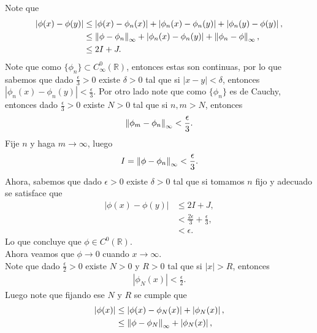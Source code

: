 \begin{homeworkProblem}
\begin{solution}
\begin{enumerate}[(i)]
        Note que
        \begin{align*}
          \left|\phi(x)-\phi(y)\right|&\leq\left| \phi(x)-\phi_{n}(x) \right|+\left| \phi_{n}(x)-\phi_{n}(y) \right|+\left| \phi_{n}(y)-\phi(y) \right|,\\
          &\leq\left\|\phi-\phi_{n}\right\|_{\infty}+\left|\phi_{n}(x)-\phi_{n}(y)\right|+\left\|\phi_{n}-\phi\right\|_{\infty},\\
          &\leq 2I + J.
        \end{align*}
        Note que como $\{\phi_{n}\}\subset C^{0}_{\infty}(\mathbb{R})$, entonces estas son continuas, por lo que sabemos que dado $\frac{\epsilon}{3}>0$ existe $\delta>0$ tal que si $|x-y|<\delta$, entonces $\left| \phi_{n}(x)-\phi_{n}(y) \right|<\frac{\epsilon}{3}$. 
        Por otro lado note que como $\{\phi_{n}\}$ es de Cauchy, entonces dado $\frac{\epsilon}{3}>0$ existe $N>0$ tal que si $n,m>N$, entonces
        \begin{align*}
          \left\|\phi_{m}-\phi_{n}\right\|_{\infty}<\frac{\epsilon}{3}.
        \end{align*}
        Fije $n$ y haga $m\to\infty$, luego
        \begin{align*}
          I = \left\|\phi-\phi_{n}\right\|_{\infty}<\frac{\epsilon}{3}.
        \end{align*}
        Ahora, sabemos que dado $\epsilon>0$ existe $\delta>0$ tal que si tomamos $n$ fijo y adecuado se satisface que
        \begin{align*}
          \left| \phi(x)-\phi(y) \right|&\leq 2I+J,\\
          &<\frac{2\epsilon}{3}+\frac{\epsilon}{3},\\
          &<\epsilon.
        \end{align*}
        Lo que concluye que $\phi\in C^{0}(\mathbb{R})$.\\
        Ahora veamos que $\phi\to 0$ cuando $x\to\infty$.\\
        Note que dado $\frac{\epsilon}{2}>0$ existe $N>0$ y $R>0$ tal que si $|x|>R$, entonces 
        \begin{align*}
          \left| \phi_{N}(x) \right|<\frac{\epsilon}{2}.
        \end{align*}
        Luego note que fijando ese $N$ y $R$ se cumple que
        \begin{align*}
          \left| \phi(x) \right|&\leq \left| \phi(x)-\phi_{N}(x) \right|+\left| \phi_{N}(x) \right|,\\
          &\leq \norm{\phi-\phi_{N}}_{\infty}+\left| \phi_{N}(x) \right|,\\

\end{align*}
\end{enumerate}
\end{solution}
\end{homeworkProblem}
